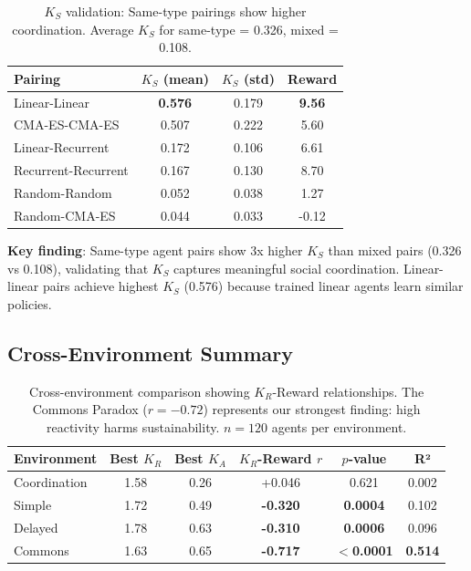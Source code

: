 \documentclass[11pt,a4paper]{article}
\newcommand{\kr}{K_R}
\newcommand{\ka}{K_A}
\newcommand{\ks}{K_S}
\begin{document}
\begin{table}[h]
\centering
\begin{tabular}{lccc}
\toprule
\textbf{Pairing} & $\ks$ (mean) & $\ks$ (std) & \textbf{Reward} \\
\midrule
Linear-Linear & \textbf{0.576} & 0.179 & \textbf{9.56} \\
CMA-ES-CMA-ES & 0.507 & 0.222 & 5.60 \\
Linear-Recurrent & 0.172 & 0.106 & 6.61 \\
Recurrent-Recurrent & 0.167 & 0.130 & 8.70 \\
Random-Random & 0.052 & 0.038 & 1.27 \\
Random-CMA-ES & 0.044 & 0.033 & -0.12 \\
\bottomrule
\end{tabular}
\caption{$\ks$ validation: Same-type pairings show higher coordination. Average $\ks$ for same-type = 0.326, mixed = 0.108.}
\label{tab:ks-validation}
\end{table}

\textbf{Key finding}: Same-type agent pairs show 3x higher $\ks$ than mixed pairs (0.326 vs 0.108), validating that $\ks$ captures meaningful social coordination. Linear-linear pairs achieve highest $\ks$ (0.576) because trained linear agents learn similar policies.

\subsection{Cross-Environment Summary}

\begin{table}[h]
\centering
\begin{tabular}{lccccc}
\toprule
\textbf{Environment} & \textbf{Best $\kr$} & \textbf{Best $\ka$} & \textbf{$\kr$-Reward $r$} & \textbf{$p$-value} & \textbf{R²} \\
\midrule
Coordination & 1.58 & 0.26 & +0.046 & 0.621 & 0.002 \\
Simple & 1.72 & 0.49 & \textbf{-0.320} & \textbf{0.0004} & 0.102 \\
Delayed & 1.78 & 0.63 & \textbf{-0.310} & \textbf{0.0006} & 0.096 \\
Commons & 1.63 & 0.65 & \textbf{-0.717} & \textbf{$<$0.0001} & \textbf{0.514} \\
\bottomrule
\end{tabular}
\caption{Cross-environment comparison showing $\kr$-Reward relationships. The Commons Paradox ($r = -0.72$) represents our strongest finding: high reactivity harms sustainability. $n = 120$ agents per environment.}
\label{tab:cross-env}
\end{table}
\end{document}
